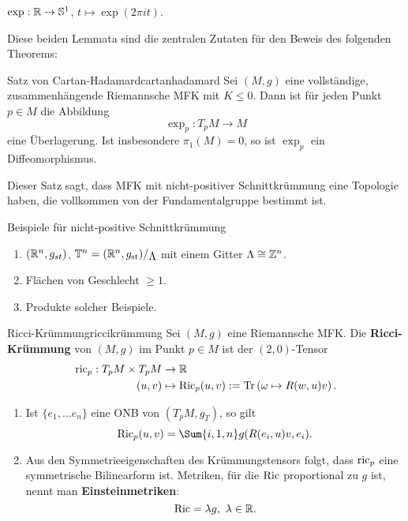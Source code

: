 \begin{beispiel}
$\exp:\mathbb{R} \to \mathbb{S}^1$, $t \mapsto \exp(2\pi i t)$.
\end{beispiel}
Diese beiden Lemmata sind die zentralen Zutaten für den Beweis des folgenden Theorems:
\begin{theorem}{Satz von Cartan-Hadamard}{cartanhadamard}
Sei $(M,g)$ eine vollständige, zusammenhängende Riemannsche MFK mit $K\leq 0$. Dann ist für jeden Punkt $p \in M$ die Abbildung
\begin{equation}
\exp_p: T_pM \to M
\end{equation}
eine Überlagerung. Ist insbesondere $\pi_1(M)=0$, so ist $\exp_p$ ein Diffeomorphismus.
\end{theorem}
Dieser Satz sagt, dass MFK mit nicht-positiver Schnittkrümmung eine Topologie haben, die vollkommen von der Fundamentalgruppe bestimmt ist.
\begin{beispiele}Beispiele für nicht-positive Schnittkrümmung\\
\begin{enumerate}
\item $(\mathbb{R}^n, g_{st})$, $\T^n = \quotient{(\R^n, g_\text{st})}{\Lambda}$ mit einem Gitter $\Lambda \cong \mathbb{Z}^n$.
\item Flächen von Geschlecht $\geq 1$.
\item Produkte solcher Beispiele.
\end{enumerate}
\end{beispiele}
\begin{definition}{Ricci-Krümmung}{riccikrümmung}
Sei $(M,g)$ eine Riemannsche MFK. Die \textbf{Ricci-Krümmung} von $(M,g)$ im Punkt $p \in M$ ist der $(2,0)$-Tensor 
\begin{align}
\operatorname{ric}_p: T_p M \times T_pM &\to \mathbb{R} \\
(u,v) &\mapsto \operatorname{Ric}_p(u,v):=\Tr \left(  \omega \mapsto R(w,u)v \right).
\end{align}
\end{definition}
\begin{bemerkungen}
\begin{enumerate}
\item Ist $\{ e_1, \dots e_n \}$ eine ONB von $(T_pM, g_T)$, so gilt
\begin{equation}
\Ric_p(u,v) = \Sum{i,1,n} g(R(e_i,u)v, e_i).
\end{equation}
\item Aus den Symmetrieeigenschaften des Krümmungstensors folgt, dass $\operatorname{ric}_p$ eine symmetrische Bilinearform ist. Metriken, für die $\operatorname{Ric}$ proportional zu $g$ ist, nennt man \textbf{Einsteinmetriken}:
\begin{equation}
\operatorname{Ric} = \lambda g, \ \lambda \in \mathbb{R}.
\end{equation}
\end{enumerate}
\end{bemerkungen}
